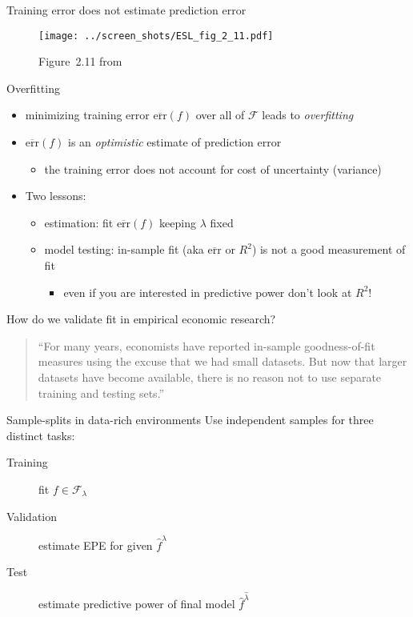 \documentclass[xcolor=dvipsnames]{beamer}
\begin{document}
\begin{frame}{Training error does not estimate prediction error}
\begin{figure}
  \texttt{[image: ../screen\_shots/ESL\_fig\_2\_11.pdf]}
   \caption{Figure~2.11 from \textcite{hastie2009elements}}
\end{figure}
\end{frame}


\begin{frame}{Overfitting}
\begin{itemize}
  \item minimizing training error $\overline{\text{err}} (f)$ over all of $\mathcal{F}$ leads to \emph{overfitting}
  \item $\overline{\text{err}} (f)$ is an \emph{optimistic} estimate of prediction error
  \begin{itemize}
    \item the training error does not account for cost of uncertainty (variance)
  \end{itemize}
\pause
  \item Two lessons: 
  \begin{itemize}
    \item estimation: fit $\overline{\text{err}} (f)$ keeping $\lambda$ fixed
    \item model testing: in-sample fit (aka $\overline{\text{err}}$ or $R^2$) is not a good measurement of fit
    \begin{itemize}
      \item even if you are interested in predictive power don't look at $R^2$!
    \end{itemize}
  \end{itemize}
\end{itemize}
\end{frame}


\begin{frame}{How do we validate fit in empirical economic research?}
\begin{quote}
``For many years, economists have reported in-sample goodness-of-fit measures using the excuse that we had small datasets. But now that larger datasets have become available, there is no reason not to use separate training and testing sets.'' \parencite{varian2014big}
\end{quote}
\end{frame}


\begin{frame}{Sample-splits in data-rich environments}
Use independent samples for three distinct tasks: 
\begin{description}
\item[Training] fit $f \in \mathcal{F}_{\lambda}$
\item[Validation] estimate EPE for given $\hat{f}^{\lambda}$
\item[Test] estimate predictive power of final model $\hat{f}^{\hat{\lambda}}$
\end{description}
\end{frame}
\end{document}
